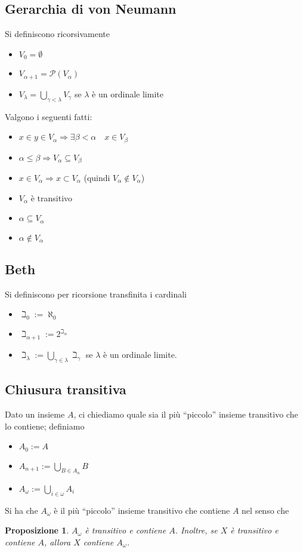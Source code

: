 \documentclass[a4paper,10pt,oneside]{article}
\theoremstyle{plain}
\newtheorem{myprop}[mytheorem]{Proposizione}
\theoremstyle{definition}
\theoremstyle{remark}
\begin{document}
\subsection{Gerarchia di von Neumann}
Si definiscono ricorsivamente
\begin{itemize}
   \item $V_0 = \emptyset$
   \item $V_{\alpha +1}=\mathcal{P}(V_\alpha)$
   \item $V_{\lambda}=\bigcup_{\gamma<\lambda}V_\gamma$ se $\lambda$ è un ordinale limite
\end{itemize}
Valgono i seguenti fatti:
\begin{itemize}
  \item $x\in y\in V_\alpha \Rightarrow \exists \beta <\alpha \quad x \in V_\beta$
  \item $\alpha\le\beta \Rightarrow V_\alpha\subseteq V_\beta$
  \item $x\in V_\alpha \Rightarrow x \subset V_\alpha$ (quindi $V_\alpha \notin V_\alpha$)
  \item $V_\alpha$ è transitivo
  \item $\alpha \subseteq V_\alpha$
  \item $\alpha \notin V_\alpha$
\end{itemize}

\subsection{Beth}
Si definiscono per ricorsione transfinita i cardinali
\begin{itemize}
 \item $\beth_0:=\aleph_0$
 \item $\beth_{\alpha+1}:=2^{\beth_\alpha}$
 \item $\beth_\lambda:=\bigcup_{\gamma\in\lambda}\beth_\gamma$ se $\lambda$ è un ordinale limite.
\end{itemize}

\subsection{Chiusura transitiva}
Dato un insieme $A$, ci chiediamo quale sia il più ``piccolo'' insieme transitivo che lo contiene; definiamo
\begin{itemize}
 \item $A_0:=A$
 \item $A_{n+1}:=\bigcup_{B\in A_n}B$
 \item $A_\omega:=\bigcup_{i\in\omega}A_i$
\end{itemize}
Si ha che $A_\omega$ è il più ``piccolo'' insieme transitivo che contiene $A$ nel senso che
\begin{myprop}
 $A_\omega$ è transitivo e contiene $A$. Inoltre, se $X$ è transitivo e contiene $A$, allora $X$ contiene $A_\omega$.
\end{myprop}
\end{document}

